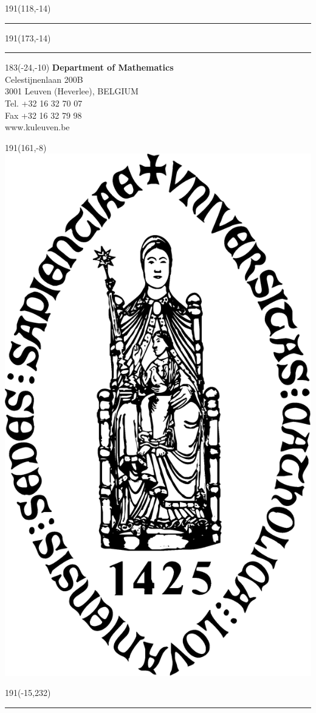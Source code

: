 \documentclass[
  12pt,
  a4paper,
  oneside]{book}
\begin{document}
\newpage
\backmatter
\thispagestyle{empty}
\sffamily
%
\begin{textblock}{191}(118,-14)
{\color{blueline}\rule{160pt}{5.5pt}}
\end{textblock}
%
\begin{textblock}{191}(173,-14)
{\color{blueline}\rule{5.5pt}{59pt}}
\end{textblock}
%
\begin{textblock}{183}(-24,-10)
\textblockcolour{}
\flushright
\fontsize{7}{7.5}\selectfont
\textbf{Department of Mathematics}\\
Celestijnenlaan 200B\\
3001 Leuven (Heverlee), BELGIUM\\
Tel. +32 16 32 70 07\\
Fax +32 16 32 79 98\\
www.kuleuven.be\\
\end{textblock}
%
\begin{textblock}{191}(161,-8)
\textblockcolour{}
\includegraphics*[height=16.5truemm]{Images/sedes}
\end{textblock}
%
\begin{textblock}{191}(-15,232)
{\color{bluetitle}\rule{544pt}{55pt}}
\end{textblock}
\end{document}
